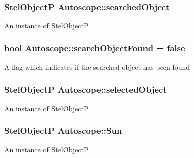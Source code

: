 \subsubsection[{\texorpdfstring{searched\+Object}{searchedObject}}]{\setlength{\rightskip}{0pt plus 5cm}Stel\+ObjectP Autoscope\+::searched\+Object\hspace{0.3cm}{\ttfamily [private]}}\hypertarget{class_autoscope_aba59abee95b4b5443709dce1d61a3498}{}\label{class_autoscope_aba59abee95b4b5443709dce1d61a3498}
An instance of Stel\+ObjectP 
\subsubsection[{\texorpdfstring{search\+Object\+Found}{searchObjectFound}}]{\setlength{\rightskip}{0pt plus 5cm}bool Autoscope\+::search\+Object\+Found = false\hspace{0.3cm}{\ttfamily [private]}}\hypertarget{class_autoscope_adcd9ee42b339c3c526231ed97c0ef6fa}{}\label{class_autoscope_adcd9ee42b339c3c526231ed97c0ef6fa}
A flag which indicates if the searched object has been found 
\subsubsection[{\texorpdfstring{selected\+Object}{selectedObject}}]{\setlength{\rightskip}{0pt plus 5cm}Stel\+ObjectP Autoscope\+::selected\+Object\hspace{0.3cm}{\ttfamily [private]}}\hypertarget{class_autoscope_a954a97691346ff2fb0981877554c1ac3}{}\label{class_autoscope_a954a97691346ff2fb0981877554c1ac3}
An instance of Stel\+ObjectP 
\subsubsection[{\texorpdfstring{Sun}{Sun}}]{\setlength{\rightskip}{0pt plus 5cm}Stel\+ObjectP Autoscope\+::\+Sun\hspace{0.3cm}{\ttfamily [private]}}\hypertarget{class_autoscope_a5bcfda333996f4fc3a959306be3e3d07}{}\label{class_autoscope_a5bcfda333996f4fc3a959306be3e3d07}
An instance of Stel\+ObjectP 
